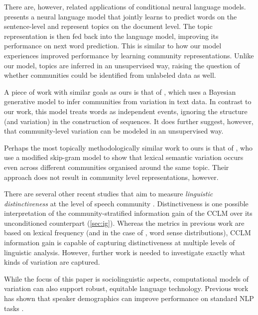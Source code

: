 \documentclass[11pt]{article}
\begin{document}
There are, however, related applications of conditional neural language models.
\citet{Lau2017a} presents a neural language model that jointly learns to predict
words on the sentence-level and represent topics on the document level.
The topic representation is then fed back into the language model, 
improving its performance on next word prediction.
This is similar to how our model experiences improved performance
by learning community representations. 
Unlike our model, topics are inferred in an unsupervised way, 
raising the question of whether communities could be identified from 
unlabeled data as well.

A piece of work with similar goals as ours is that of \citet{OConnor2010}, which uses a Bayesian generative
model to infer communities from variation in text data.  In contrast
to our work, this model treats words as independent events, ignoring
the structure (and variation) in the construction of sequences.  It
does further suggest, however, that community-level variation can be
modeled in an unsupervised way.

Perhaps the most topically methodologically similar work to ours 
is that of \citet{DelTredici2017}, who use a modified
skip-gram model to show that lexical semantic variation occurs even across 
different communities organised around the same topic.
Their approach does not result in community level representations, however.

There are several other recent studies that aim to measure \emph{linguistic distinctiveness}
at the level of speech community \citep{OConnor2010,Zhang2018,Lucy2021}.
Distinctiveness is one possible interpretation of the community-stratified information gain 
of the CCLM over its unconditioned counterpart (\cref{sec:ig}). 
Whereas the metrics in previous work are based on lexical frequency
(and in the case of \citet{Lucy2021}, word sense distributions),
CCLM information gain is capable of capturing 
distinctiveness at multiple levels of linguistic analysis. 
However, further work is needed to
investigate exactly what kinds of variation are captured.

While the focus of this paper is sociolinguistic aspects,
computational models of variation can also support 
robust, equitable language technology.  Previous work has shown that
speaker demographics can improve performance on standard NLP tasks
\citep{Hovy2015,Yang2017}. %

\end{document}
